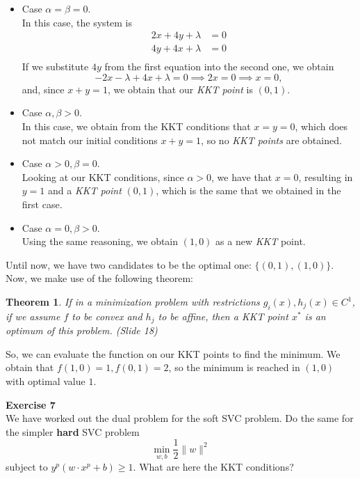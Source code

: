 \documentclass[11pt,table]{article}
\newtheorem{nth}{Theorem}
\newenvironment{problem}[2][Exercise]
    { \begin{mdframed}[backgroundcolor=gray!20] \textbf{#1 #2} \\}
    {  \end{mdframed}}
\newcommand\norm[1]{\lVert#1\rVert}
\begin{document}
\begin{itemize}
  \item Case \(\alpha = \beta = 0\).\\
        In this case, the system is
        \begin{align*}
          2x + 4y + \lambda & = 0 \\
          4y + 4x + \lambda & = 0 \\
        \end{align*}
        If we substitute \(4y\) from the first equation into the second one, we obtain
        \[
          -2x - \lambda + 4x + \lambda = 0 \implies 2x = 0  \implies x = 0,
        \]
        and, since \(x+y = 1\), we obtain that our \emph{KKT point} is \((0,1)\).
  \item Case \(\alpha, \beta > 0\).\\
        In this case, we obtain from the KKT conditions that \(x=  y = 0\), which does not match our initial conditions \(x+y = 1\), so no \emph{KKT points} are obtained.
  \item Case \(\alpha > 0, \beta = 0\).\\
        Looking at our KKT conditions, since \(\alpha > 0\), we have that \(x = 0\), resulting in \(y=1\) and a \emph{KKT point} \((0,1)\), which is the same that we obtained in the first case.\\
  \item Case \(\alpha = 0, \beta > 0\).\\
        Using the same reasoning, we obtain \((1,0)\) as a new \emph{KKT} point.
\end{itemize}

Until now, we have two candidates to be the optimal one: \(\{(0,1),(1,0)\}\). Now, we make use of the following theorem:

\begin{nth}
  If in a minimization problem with restrictions \(g_i(x), h_j(x) \in C^1\), if we assume \(f\) to be convex and \(h_j\) to be affine, then a KKT point \(x^*\) is an optimum of this problem. (Slide 18)
\end{nth}

So, we can evaluate the function on our KKT points to find the minimum. We obtain that \(f(1,0) = 1, f(0,1) = 2\), so the minimum is reached in \((1,0)\) with optimal value \(1\).

\begin{problem}{7}
We have worked out the dual problem for the soft SVC problem. Do the same for the simpler \textbf{hard} SVC problem
\[
  \min_{w,b} \frac{1}{2} \norm{w}^2
\]
subject to \(y^p\left(w \cdot x^p + b\right) \geq 1\). What are here the KKT conditions?
\end{problem}
\end{document}
